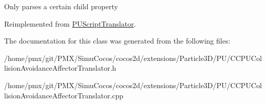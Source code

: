 Only parses a certain child property 

Reimplemented from \hyperlink{classPUScriptTranslator_a0374d83a8a04e57918975d525e0f8fe8}{P\+U\+Script\+Translator}.



The documentation for this class was generated from the following files\+:\begin{DoxyCompactItemize}
\item 
/home/pmx/git/\+P\+M\+X/\+Simu\+Cocos/cocos2d/extensions/\+Particle3\+D/\+P\+U/C\+C\+P\+U\+Collision\+Avoidance\+Affector\+Translator.\+h\item 
/home/pmx/git/\+P\+M\+X/\+Simu\+Cocos/cocos2d/extensions/\+Particle3\+D/\+P\+U/C\+C\+P\+U\+Collision\+Avoidance\+Affector\+Translator.\+cpp\end{DoxyCompactItemize}
